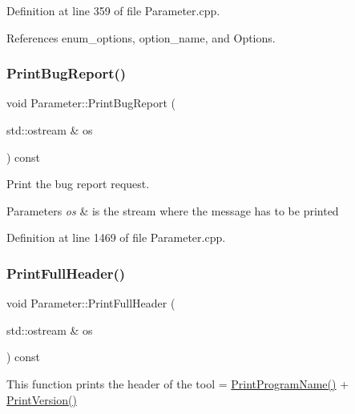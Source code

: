 Definition at line 359 of file Parameter.\+cpp.



References enum\+\_\+options, option\+\_\+name, and Options.

\mbox{\label{classParameter_a6f21fae61f8fdac8740ca865326968c2}} 
\subsubsection{\texorpdfstring{Print\+Bug\+Report()}{PrintBugReport()}}
{\footnotesize\ttfamily void Parameter\+::\+Print\+Bug\+Report (\begin{DoxyParamCaption}\item[{std\+::ostream \&}]{os }\end{DoxyParamCaption}) const}



Print the bug report request. 


\begin{DoxyParams}{Parameters}
{\em os} & is the stream where the message has to be printed \\
\hline
\end{DoxyParams}


Definition at line 1469 of file Parameter.\+cpp.

\mbox{\label{classParameter_a6fe1104ddce89c78863f29884d1595b5}} 
\subsubsection{\texorpdfstring{Print\+Full\+Header()}{PrintFullHeader()}}
{\footnotesize\ttfamily void Parameter\+::\+Print\+Full\+Header (\begin{DoxyParamCaption}\item[{std\+::ostream \&}]{os }\end{DoxyParamCaption}) const\hspace{0.3cm}{\ttfamily [virtual]}}



This function prints the header of the tool = \hyperlink{classParameter_afe71fca464da99b2ff720d3ad15df051}{Print\+Program\+Name()} + \hyperlink{classParameter_a061fc14e1db48812ec5a6e7d6e80e1a0}{Print\+Version()} 



